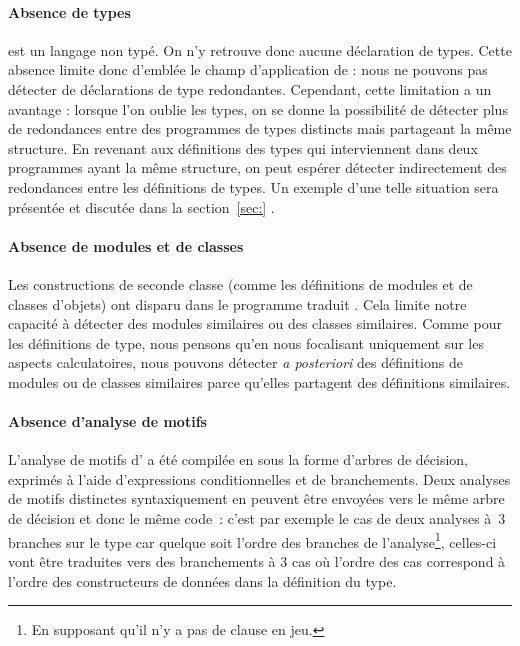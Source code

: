 \paragraph{Absence de types}
{\LambdaCode} est un langage non typé. On n'y retrouve donc aucune
déclaration de types. Cette absence limite donc d'emblée le champ
d'application de {\Asak}: nous ne pouvons pas détecter de déclarations
de type redondantes. Cependant, cette limitation a un avantage :
lorsque l'on oublie les types, on se donne la possibilité de détecter
plus de redondances entre des programmes de types distincts mais
partageant la même structure. En revenant aux définitions des types
qui interviennent dans deux programmes ayant la même structure, on
peut espérer détecter indirectement des redondances entre les
définitions de types.
%
Un exemple d'une telle situation sera présentée
et discutée dans la section~\ref{sec:} .

\paragraph{Absence de modules et de classes}
Les constructions de seconde classe (comme les définitions de modules
et de classes d'objets) ont disparu dans le programme traduit
{\LambdaCode}. Cela limite notre capacité à détecter des modules
similaires ou des classes similaires. Comme pour les définitions de
type, nous pensons qu'en nous focalisant uniquement sur les aspects
calculatoires, nous pouvons détecter \textit{a posteriori} des
définitions de modules ou de classes similaires parce qu'elles
partagent des définitions similaires.

\paragraph{Absence d'analyse de motifs}
L'analyse de motifs d'{\OCaml} a été compilée en {\LambdaCode} sous la
forme d'arbres de décision, exprimés à l'aide d'expressions
conditionnelles et de branchements. Deux analyses de motifs distinctes
syntaxiquement en {\OCaml} peuvent être envoyées vers le même arbre de
décision et donc le même code~\LambdaCode: c'est par exemple le cas de deux
analyses à~$3$ branches sur le type  car quelque soit l'ordre des branches de
l'analyse\footnote{En supposant qu'il n'y a pas de clause
   en jeu.}, celles-ci vont être traduites vers des
branchements à $3$ cas où l'ordre des cas correspond à l'ordre des
constructeurs de données dans la définition du type.

